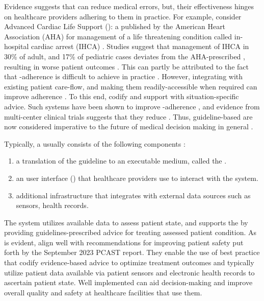Evidence suggests that \BPGs{} can reduce medical errors, but,
their effectiveness hinges on healthcare providers adhering to them in practice.
For example, consider Advanced Cardiac Life Support (\ACLS{}): a \BPG{} published
by the American Heart Association (AHA) for management
of a life threatening condition called in-hospital cardiac arrest (IHCA) \cite{AHAGuidelineAdult, AHAGuidelinePed}. Studies suggest that management
of IHCA in 30\% of adult, and 17\% of pediatric cases deviates from the
AHA-prescribed \BPG, resulting in worse patient outcomes \cite{Ornato2012DeviationAdult,Wolfe2020DeviationPediatric,
Crowley2020DeviationAdult,Honarmand2018Adherence,Mcevoy2014Adherence}.
This can partly be attributed to the fact
that \BPG{}-adherence is difficult to achieve in
practice \cite{RandJAMA99,DavisCMAJ97}. However,
integrating \BPGs{} with existing patient care-flow,
and making them readily-accessible when required can improve adherence \cite{WoolfBMJ99}.
To this end, \CDSSs{}
codify \BPGs{} and support \HCPs{} with situation-specific advice.
Such systems have been shown to improve \BPG{}-adherence \cite{GargJAMA06,KawamotoBMJ05}, and evidence from multi-center clinical trials
suggests that they reduce \PMEs{} \cite{BenettJAMIA16,SahotaJIS11}.
Thus, guideline-based \CDSSs{} are now considered imperative to the
future of medical decision making in general \cite{JamesNEJM01}.

Typically, a \CDSS{} usually consists of the following components \cite{SuttonNature20}:
\begin{enumerate}[label=(\alph*)]
  \item a translation of the guideline to an executable medium, called the
  \BPGLogic{}.
\item an user interface (\UI{}) that healthcare providers use to interact with
  the system.
  \item additional infrastructure that integrates with external data sources
  such as sensors, health records.
\end{enumerate}
The system utilizes available data to assess patient state, and
supports the \HCP{} by providing guidelines-prescribed advice for treating
assessed patient condition. As is evident, \CDSSs{} align well with
recommendations for improving patient safety put forth by the September 2023
PCAST report. They enable the use of best practice that codify evidence-based
advice to optimize treatment outcomes and typically utilize patient data
available via patient sensors and electronic health records to ascertain patient
state. Well implemented \CDSSs{} can aid decision-making and improve overall
quality and safety at healthcare facilities that use them.

